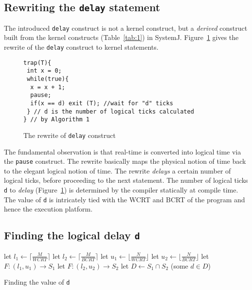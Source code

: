\subsection{Rewriting the \texttt{delay} statement}
\label{sec:rewr-delay-stat}

The introduced \texttt{delay} construct is not a kernel construct, but a
\textit{derived} construct built from the kernel constructs
(Table~\ref{tab:1}) in SystemJ. Figure~\ref{fig:3} gives the rewrite of
the \texttt{delay} construct to kernel statements.

\begin{figure}[tb]
	\vspace{-10pt}
    \begin{minipage}{\textwidth}
		\begin{lstlisting}[style=sysj,morekeywords={abort,await,emit,present,trap,pause,exit,delay,suspend}]
trap(T){
 int x = 0;
 while(true){
  x = x + 1;
  pause;
  if(x == d) exit (T); //wait for "d" ticks
 } // d is the number of logical ticks calculated
} // by Algorithm 1
\end{lstlisting}
    \end{minipage}
    \caption{The rewrite of \texttt{delay} construct}
    \label{fig:3}
\end{figure}

The fundamental observation is that real-time is converted into logical
time via the \texttt{pause} construct. The rewrite basically maps the
physical notion of time back to the elegant logical notion of time. The
rewrite \textit{delays} a certain number of logical ticks, before
proceeding to the next statement. The number of logical ticks \texttt{d}
to \textit{delay} (Figure~\ref{fig:3}) is determined by the compiler
statically at compile time. The value of \texttt{d} is intricately tied
with the WCRT and BCRT of the program and hence the execution platform.

\subsection{Finding the logical delay \texttt{d}}
\label{sec:find-logic-delay}

\begin{algorithm}[t!]
  \begin{minipage}{1.0\linewidth}
    \SetAlgoLined
    let $l_1 \leftarrow \lceil \frac{M}{WCRT} \rceil$\;
    let $l_2 \leftarrow \lceil \frac{M}{BCRT} \rceil$\;
    let $u_1 \leftarrow \lfloor \frac{N}{WCRT} \rfloor$\;
    let $u_2 \leftarrow \lfloor \frac{N}{BCRT} \rfloor$\;
    let $F:(l_1,u_1) \rightarrow S_1$\;
    let $F:(l_2,u_2) \rightarrow S_2$\;
    let $D \leftarrow S_1 \cap S_2$\;
    \Return (some $d \in D$)\;
    \caption{Finding the value of \texttt{d}}
    \label{alg:1}
  \end{minipage}
\end{algorithm}

